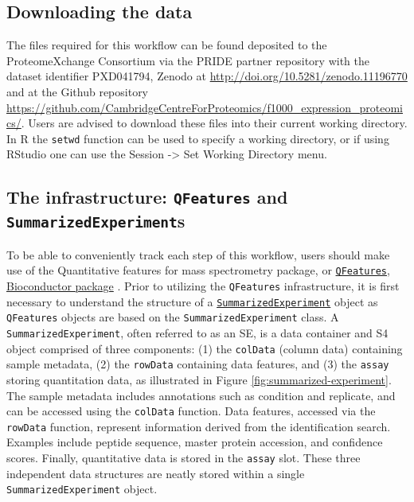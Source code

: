 \documentclass[9pt,a4paper,]{extarticle}
\begin{document}
\subsection{Downloading the data}\label{downloading-the-data}

The files required for this workflow can be found deposited to the ProteomeXchange
Consortium via the PRIDE \citep{PerezRiverol2021, Deutsch2022} partner repository
with the dataset identifier PXD041794, Zenodo at \url{http://doi.org/10.5281/zenodo.11196770}
and at the Github repository \url{https://github.com/CambridgeCentreForProteomics/f1000_expression_proteomics/}.
Users are advised to download these files into their current working directory.
In R the \texttt{setwd} function can be used to specify a working directory, or if
using RStudio one can use the Session -\textgreater{} Set Working Directory menu.

\subsection{\texorpdfstring{The infrastructure: \texttt{QFeatures} and \texttt{SummarizedExperiment}s}{The infrastructure: QFeatures and SummarizedExperiments}}\label{the-infrastructure-qfeatures-and-summarizedexperiments}

To be able to conveniently track each step of this workflow, users should make
use of the Quantitative features for mass spectrometry package, or
\href{https://www.bioconductor.org/packages/release/bioc/html/QFeatures.html}{\texttt{QFeatures}, Bioconductor package}
\citep{QFeat}. Prior to utilizing the \texttt{QFeatures} infrastructure, it is first necessary to
understand the structure of a \href{https://bioconductor.org/packages/release/bioc/html/SummarizedExperiment.html}{\texttt{SummarizedExperiment}}
\citep{SumExp} object as \texttt{QFeatures} objects are based on the \texttt{SummarizedExperiment}
class. A \texttt{SummarizedExperiment}, often referred to as an SE, is a data container
and S4 object comprised of three components: (1) the \texttt{colData} (column data)
containing sample metadata, (2) the \texttt{rowData} containing data features, and (3)
the \texttt{assay} storing quantitation data, as illustrated in Figure
\ref{fig:summarized-experiment}. The sample metadata includes annotations such
as condition and replicate, and can be accessed using the \texttt{colData} function.
Data features, accessed via the \texttt{rowData} function, represent information
derived from the identification search. Examples include peptide sequence,
master protein accession, and confidence scores. Finally, quantitative data is
stored in the \texttt{assay} slot. These three independent data structures are neatly
stored within a single \texttt{SummarizedExperiment} object.
\end{document}
